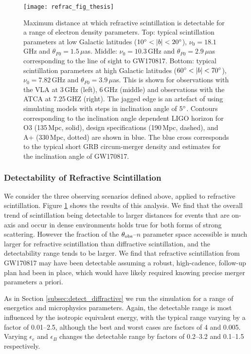 \begin{figure*}
\centering
\texttt{[image: refrac\_fig\_thesis]}
\caption[Detectability of refractive scintillation with current radio facilities]{\footnotesize Maximum distance at which refractive scintillation is detectable for a range of electron density parameters. Top: typical scintillation parameters at low Galactic latitudes ($10\arcdeg<|b|<20\arcdeg$), $\nu_0 = 18.1$\,GHz and $\theta_{F0} = 1.5\,\mu$as. Middle: $\nu_0 = 10.3$\,GHz and $\theta_{F0} = 2.9\,\mu$as corresponding to the line of sight to GW170817. Bottom: typical scintillation parameters at high Galactic latitudes ($60\arcdeg<|b|<70\arcdeg$), $\nu_0 = 7.82$\,GHz and $\theta_{F0} = 3.9\,\mu$as. This is shown for observations with the VLA at 3\,GHz (left), 6\,GHz (middle) and observations with the ATCA at 7.25\,GHZ (right).  The jagged edge is an artefact of using simulating models with steps in inclination angle of $5\mbox{$^\circ$}$. Contours corresponding to the inclination angle dependent LIGO horizon for O3 (135\,Mpc, solid), design specifications (190\,Mpc, dashed), and A+ (330\,Mpc, dotted) are shown in blue. The blue cross corresponds to the typical short GRB circum-merger density and estimates for the inclination angle of GW170817.}
\label{fig:scintillation_distance}
\end{figure*}


\subsubsection{Detectability of Refractive Scintillation}
\label{subsec:detect_refractive}
\vspace{-6pt}
We consider the three observing scenarios defined above, applied to refractive scintillation. Figure \ref{fig:scintillation_distance} shows the results of this analysis. We find that the overall trend of scintillation being detectable to larger distances for events that are on-axis and occur in dense environments holds true for both forms of strong scattering. However the fraction of the $\theta_{\rm obs}$--$n$ parameter space accessible is much larger for refractive scintillation than diffractive scintillation, and the detectability range tends to be larger. We find that refractive scintillation from GW170817 may have been detectable assuming a robust, high-cadence, follow-up plan had been in place, which would have likely required knowing precise merger parameters a priori.

As in Section \ref{subsec:detect_diffractive} we run the simulation for a range of energetics and microphysics parameters. Again, the detectable range is most influenced by the isotropic equivalent energy, with the typical range varying by a factor of 0.01--2.5, although the best and worst cases are factors of 4 and 0.005. Varying $\epsilon_e$ and $\epsilon_B$ changes the detectable range by factors of 0.2--3.2 and 0.1--1.5 respectively.


